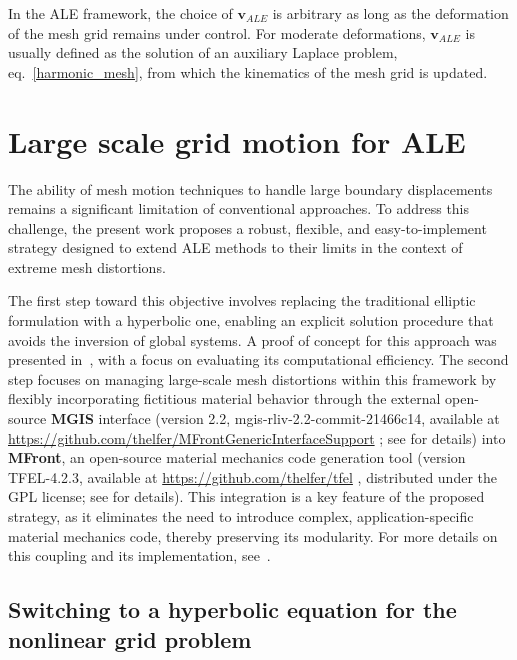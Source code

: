In the ALE framework, the choice of ${\textbf{v}}_{ALE}$ is arbitrary as long as the deformation of the mesh grid remains under control. For moderate deformations, ${\textbf{v}}_{ALE}$ is usually defined as the solution of an auxiliary Laplace problem, eq.~\eqref{harmonic_mesh},
from which the kinematics of the mesh grid is updated.

\chapter{Large scale grid motion for ALE}

The ability of mesh motion techniques to handle large boundary displacements remains a significant limitation of conventional approaches. To address this challenge, the present work proposes a robust, flexible, and easy-to-implement strategy designed to extend ALE methods to their limits in the context of extreme mesh distortions.

The first step toward this objective involves replacing the traditional elliptic formulation with a hyperbolic one, enabling an explicit solution procedure that avoids the inversion of global systems. A proof of concept for this approach was presented in~\cite{leprevost_computationally_2023}, with a focus on evaluating its computational efficiency. The second step focuses on managing large-scale mesh distortions within this framework by flexibly incorporating fictitious material behavior through the external open-source \textbf{MGIS} interface (version 2.2, mgis-rliv-2.2-commit-21466c14, available at \url{https://github.com/thelfer/MFrontGenericInterfaceSupport}
; see \cite{helfer_mfrontgenericinterfacesupport_2020} for details) into \textbf{MFront}, an open-source material mechanics code generation tool (version TFEL-4.2.3, available at \url{https://github.com/thelfer/tfel}
, distributed under the GPL license; see \cite{helfer_introducing_2015} for details). This integration is a key feature of the proposed strategy, as it eliminates the need to introduce complex, application-specific material mechanics code, thereby preserving its modularity. For more details on this coupling and its implementation, see~\cite{faucher2024very}.

\section{Switching to a hyperbolic equation for the nonlinear grid problem}

